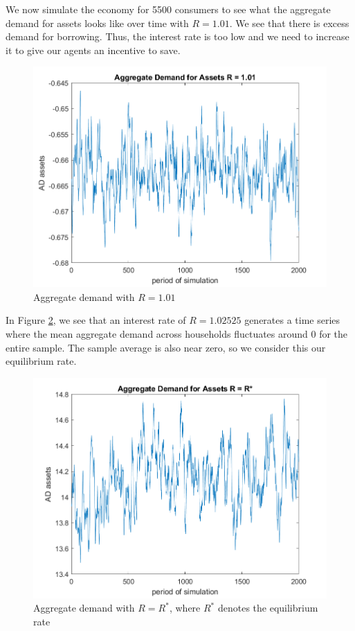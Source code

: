 \documentclass[12pt,letter]{article}
\begin{document}
We now simulate the economy for 5500 consumers to see what the aggregate demand for assets looks like over time with $R = 1.01$. We see that there is excess demand for borrowing. Thus, the interest rate is too low and we need to increase it to give our agents an incentive to save. 


\begin{figure}[H]
	\centering
	\includegraphics[scale=0.75]{aggregate_demand.png}
	\caption{Aggregate demand with $R=1.01$}
	\label{fig:agg_demand_high_r}
\end{figure}

In Figure \ref{fig:agg_demand_equilibrium}, we see that an interest rate of $R = 1.02525$ generates a time series where the mean aggregate demand across households fluctuates around 0 for the entire sample. The sample average is also near zero, so we consider this our equilibrium rate. 
\begin{figure}[H]
	\centering
	\includegraphics[scale=0.75]{aggregate_demand_equilibrium.png}
	\caption{Aggregate demand with $R=R^*$, where $R^*$ denotes the equilibrium rate}
	\label{fig:agg_demand_equilibrium}
\end{figure}
\end{document}
